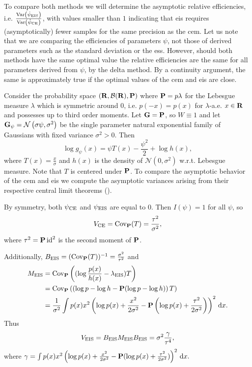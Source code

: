 To compare both methods we will determine the asymptotic relative efficiencies, i.e. $ \frac{\var \left( \hpeis \right)}{\var \left( \hpce \right)}$, with values smaller than $1$ indicating that \gls{eis} requires (asymptotically) fewer samples for the same precision as the \gls{cem}.
Let us note that we are comparing the efficiencies of parameters $\psi$, not those of derived parameters such as the standard deviation or the \gls{ess}. However, should both methods have the same optimal value the relative efficiencies are the same for all parameters derived from $\psi$, by the delta method. By a continuity argument, the same is approximately true if the optimal values of the \gls{cem} and \gls{eis} are close.

\begin{example}
    \label{ex:univ-gaussian-s2-fixed}
    Consider the probability space $ \left( \R, \mathcal B(\R), \P \right)$ where $\P = p\lambda$ for the Lebesgue measure $\lambda$ which is symmetric around $0$, i.e. $p(-x) = p(x)$ for $\lambda$-a.e. $x\in\R$ and possesses up to third order moments.
    Let $\G=\P$, so $W\equiv1$ and let $\G_{\psi} = \mathcal N \left( \sigma\psi, \sigma^{2} \right)$ be the single parameter natural exponential family of Gaussians with fixed variance $\sigma^{2} > 0$. Then 
    $$
    \log g_{\psi}(x) = \psi T(x) - \frac{\psi^{2}}{2} + \log h(x),
    $$
    where $T(x) = \frac{x}{\sigma}$ and $h(x)$ is the density of $\mathcal N(0, \sigma^{2})$ w.r.t. Lebesgue measure. 
    Note that $T$ is centered under $\P$. To compare the asymptotic behavior of the \gls{cem} and \gls{eis} we compute the asymptotic variances arising from their respective central limit theorems ().

    By symmetry, both $\pce$ and $\peis$ are equal to $0$. 
    Then $I(\psi) = 1$ for all $\psi$, so 
    \begin{align}
    \label{eq:ce-gaussian-mean-var}
        V_{\ce} = \cov_{\P}(T) = \frac{\tau^{2}}{\sigma^{2}},
    \end{align}
    where $\tau^{2}=\P \operatorname{id}^{2}$ is the second moment of $\P$. 

    Additionally, $B_{\eis} = (\cov_{\P}(T))^{-1} = \frac{\sigma^{2}}{\tau^{2}}$ and
    \begin{align*}
    M_{\eis} &= \cov_{\P} \left( (\log \frac{p(x)}{h(x)} - \lambda_{\eis})T\right) \\
        &= \cov_{\P} \left(\left( \log p - \log h - \P (\log p - \log h) \right) T \right) \\
        &= \frac{1}{\sigma^{2}}\int p(x) x^{2}\left(\log p(x) + \frac{x^{2}}{2\sigma^{2}} - \P\left(\log p(x) + \frac{\tau^{2}}{2\sigma^{2}}\right)\right)^{2} \d x.
    \end{align*}
    Thus
    $$
    V_{\eis} = B_{\eis}M_{\eis}B_{\eis}= \sigma^{2}\frac{\gamma}{\tau^{4}},
    $$
    where $\gamma = \int p(x) x^{2}\left(\log p(x) + \frac{x^{2}}{2\sigma^{2}} - \P(\log p(x) + \frac{\tau^{2}}{2\sigma^{2}})\right)^{2} \d x.$
    

\end{example}
